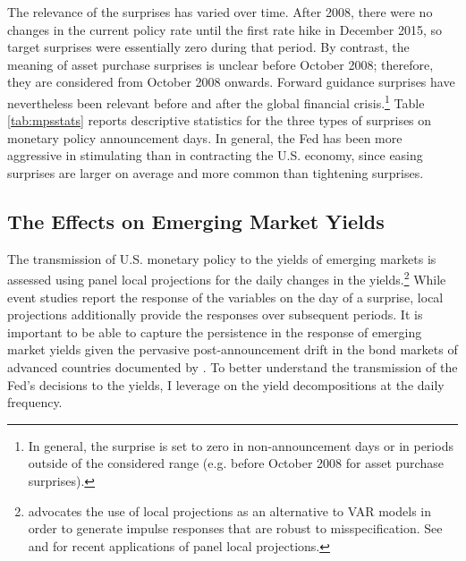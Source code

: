 {%
The relevance of the surprises has varied over time.
After 2008, there were no changes in the current policy rate until the first rate hike in December 2015, so target surprises were essentially zero during that period.
By contrast, the meaning of asset purchase surprises is unclear before October 2008; therefore, they %
are considered from October 2008 onwards.
Forward guidance surprises have nevertheless been relevant before and after the global financial crisis.\footnote{ In general, the surprise is set to zero in non-announcement days or in periods outside of the considered range (e.g. before October 2008 for asset purchase surprises).}
Table \ref{tab:mpsstats} reports descriptive statistics for the three types of surprises on monetary policy announcement days.
In general, the Fed has been more aggressive in stimulating than in contracting the U.S. economy, since easing surprises are larger on average and more common than tightening surprises.


\subsection{The Effects on Emerging Market Yields} \label{sec:LPs} %
\iftoggle{toclinks}{\gototoc}{} %

The transmission of U.S. monetary policy to the yields of emerging markets is assessed using panel local projections for the daily changes in the 
yields.\footnote{ \cite{Jorda:2005} advocates the use of local projections as an alternative to VAR models in order to generate impulse responses that are robust to misspecification. See \cite{HofmannShimShin:2019} and \cite{ACDM:2019} for recent applications of panel local projections.}
While event studies report the response of the variables on the day of a surprise,
local projections %
additionally provide the responses over subsequent periods.
It is important to be able to capture the persistence in the response of emerging market yields given the pervasive post-announcement drift in the bond markets 
of advanced countries documented by \cite{BrooksKatzLustig:2019}.
To better understand the transmission of the Fed's decisions to the yields, I leverage on the yield decompositions at the daily frequency. %

}
